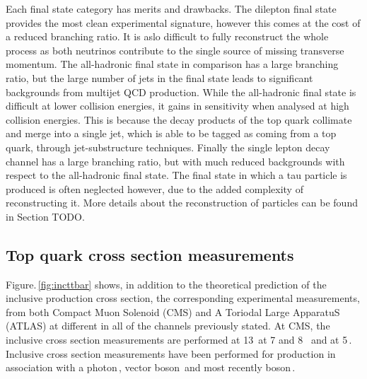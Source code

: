 Each final state category has merits and drawbacks. 
The dilepton final state provides the most clean experimental signature, however this comes at the cost of a reduced branching ratio.
It is aslo difficult to fully reconstruct the whole process as both neutrinos contribute to the single source of missing transverse momentum.
The all-hadronic final state in comparison has a large branching ratio, but the large number of jets in the final state leads to significant backgrounds from multijet QCD production.
While the all-hadronic final state is difficult at lower collision energies, it gains in sensitivity when analysed at high collision energies.
This is because the decay products of the top quark collimate and merge into a single jet, which is able to be tagged as coming from a top quark, through jet-substructure techniques.
Finally the single lepton decay channel has a large branching ratio, but with much reduced backgrounds with respect to the all-hadronic final state. The final state in which a tau particle is produced is often neglected however, due to the added complexity of reconstructing it.
More details about the reconstruction of particles can be found in Section TODO.

\subsection{Top quark cross section measurements} %
\label{sub:top_quark_cross_section_measurements}

Figure.\,\ref{fig:incttbar} shows, in addition to the theoretical prediction of the inclusive \ttbar{} production cross section, the corresponding experimental measurements, from both Compact Muon Solenoid (CMS) and A Toriodal Large ApparatuS (ATLAS) at different \sqrts{} in all of the channels previously stated.
At CMS, the inclusive \ttbar{} cross section measurements are performed at 13\TeV{}\,\cite{TOP16005, TOP16006} at 7 and 8 \TeV{}\,\cite{TOP10001, TOP10002, TOP10003, TOP11002, TOP11003, TOP11004, TOP11005, TOP12007, TOP12026, TOP12041, TOP13004, TOP14018} and at 5\TeV{}\,\cite{TOP16023}.
Inclusive cross section measurements have been performed for \ttbar{} production in association with a photon\,\cite{TOP14008}, vector boson\,\cite{TOP17005} and most recently \Hboson{} boson\,\cite{HIG17035}.

